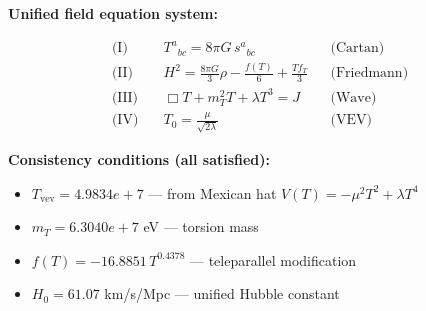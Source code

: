 
\textbf{Unified field equation system:}

\begin{align}
  \text{(I)} \quad & T^a{}_{bc} = 8\pi G \, s^a{}_{bc} && \text{(Cartan)} \\
  \text{(II)} \quad & H^2 = \frac{8\pi G}{3}\rho - \frac{f(T)}{6} + \frac{Tf_T}{3} && \text{(Friedmann)} \\
  \text{(III)} \quad & \Box T + m_T^2 T + \lambda T^3 = J && \text{(Wave)} \\
  \text{(IV)} \quad & T_0 = \frac{\mu}{\sqrt{2\lambda}} && \text{(VEV)}
\end{align}

\textbf{Consistency conditions (all satisfied):}
\begin{itemize}
  \item $T_{\text{vev}} = 4.9834e+7$ — from Mexican hat $V(T) = -\mu^2 T^2 + \lambda T^4$
  \item $m_T = 6.3040e+7$ eV — torsion mass
  \item $f(T) = -16.8851 \, T^{0.4378}$ — teleparallel modification
  \item $H_0 = 61.07$ km/s/Mpc — unified Hubble constant
\end{itemize}